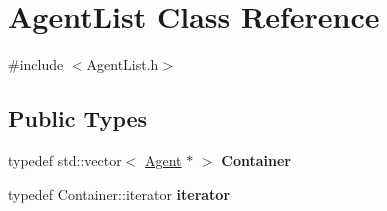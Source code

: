 \hypertarget{class_agent_list}{}\section{Agent\+List Class Reference}
\label{class_agent_list}


{\ttfamily \#include $<$Agent\+List.\+h$>$}

\subsection*{Public Types}
\begin{DoxyCompactItemize}
\item 
\mbox{\label{class_agent_list_a631c10e4f7044e77d7927f1d543da7da}} 
typedef std\+::vector$<$ \hyperlink{class_agent}{Agent} $\ast$ $>$ {\bfseries Container}
\item 
\mbox{\label{class_agent_list_af8a18adbf172b9e8782b7bb1367a49c1}} 
typedef Container\+::iterator {\bfseries iterator}
\end{DoxyCompactItemize}
